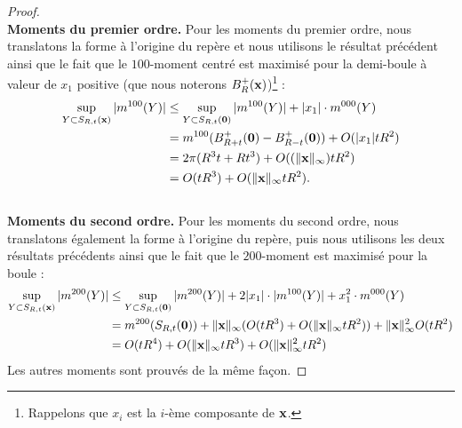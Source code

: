 \begin{proof}
%
\textbf{\\Moments du premier ordre.\quad}
%
Pour les moments du premier ordre, nous translatons la forme à l'origine du
repère et nous utilisons le résultat précédent ainsi que le fait que le
$100$-moment centré est maximisé pour la demi-boule à valeur de $x_1$ positive
(que nous noterons $B^+_{R}(\mathbf{x})$)\footnote{Rappelons que $x_i$ est la
$i$-ème composante de $\mathbf{x}$.} :
%
\begin{align}
  \sup_{Y \subset S_{R,t}(\mathbf{x})} |m^{100}(Y)|
  &\le \sup_{Y \subset S_{R,t}(\mathbf{0})} |m^{100}(Y)| + |x_1|\cdot m^{000}(Y)\nonumber \\
  &= m^{100}( B^+_{R+t}(\mathbf{0}) - B^+_{R-t}(\mathbf{0}) ) + O(|x_1|tR^2) \nonumber \\
  &= 2\pi(R^3t +Rt^3) + O( (\| \mathbf{x} \|_\infty) tR^2) \nonumber \\
  &= O(tR^3) + O(\| \mathbf{x} \|_\infty tR^2).
\end{align}
%
\textbf{\\Moments du second ordre.\quad}
%
Pour les moments du second ordre, nous translatons également la forme à
l'origine du repère, puis nous utilisons les deux résultats précédents ainsi que
le fait que le $200$-moment est maximisé pour la boule :
%
\begin{align}
  \sup_{Y \subset S_{R,t}(\mathbf{x})} |m^{200}(Y)| &
  \le \sup_{Y \subset S_{R,t}(\mathbf{0})} |m^{200}(Y)| + 2|x_1|\cdot |m^{100}(Y)| + x_1^2\cdot m^{000}(Y) \nonumber \\
  & = m^{200}(S_{R,t}(\mathbf{0})) + \|\mathbf{x}\|_\infty (O(tR^3) + O(\|\mathbf{x}\|_\infty tR^2))+  \|\mathbf{x}\|_\infty^2 O(tR^2) \nonumber \\
  & = O(tR^4) +O(\|\mathbf{x}\|_\infty tR^3) +O(\|\mathbf{x}\|_\infty^2 tR^2)
\end{align}
%
Les autres moments sont prouvés de la même façon.
%
\end{proof}
%
